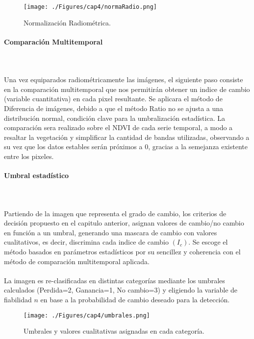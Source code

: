 	\begin{figure}[H]
		\centering
		\texttt{[image: ./Figures/cap4/normaRadio.png]}
		\caption{Normalizaci\'on Radiom\'etrica.}
		\label{fig:normRadio}
	\end{figure}
	
	
\paragraph{Comparaci\'on Multitemporal}\mbox{}\\\mbox{}\\
Una vez equiparados radiom\'etricamente las im\'agenes, el siguiente paso consiste en la comparaci\'on multitemporal que nos permitir\'an obtener un indice de cambio (variable cuantitativa) en cada pixel resultante. Se aplicara el m\'etodo de Diferencia de im\'agenes, debido a que el m\'etodo Ratio no se ajusta a una distribuci\'on normal, condici\'on clave para la umbralizaci\'on estad\'istica. La comparaci\'on sera realizado sobre el NDVI de cada serie temporal, a modo a resaltar la vegetaci\'on y simplificar la cantidad de bandas utilizadas, observando a su vez que los datos estables ser\'an pr\'oximos a 0, gracias a la semejanza existente entre los pixeles. 
\paragraph{Umbral estad\'istico}\mbox{}\\\mbox{}\\
Partiendo de la imagen que representa el grado de cambio, los criterios de decisi\'on propuesto en el capitulo anterior, asignan valores de cambio/no cambio en funci\'on a un umbral, generando una mascara de cambio con valores cualitativos, es decir, discrimina cada indice de cambio $ (I_{c}) $. Se escoge el m\'etodo basados en par\'ametros estad\'isticos por su sencillez y coherencia con el m\'etodo de comparaci\'on multitemporal aplicada. \\~\\
La imagen es re-clasificadas en distintas categor\'ias mediante los umbrales calculados (Perdida=2, Ganancia=1, No cambio=3) y eligiendo la variable de fiabilidad $ n $ en base a la probabilidad de cambio deseado para la detecci\'on.
	\begin{figure}[H]
		\centering
		\texttt{[image: ./Figures/cap4/umbrales.png]}
		\caption{Umbrales y valores cualitativas asignadas en cada categor\'ia.}
		\label{fig:umbrales}
	\end{figure}
